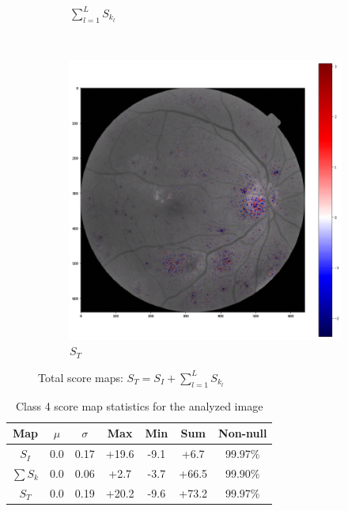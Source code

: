 \begin{figure}[!ht]
\begin{subfigure}{0.45\textwidth}
		\caption{$\sum_{l=1}^L S_{k_l}$}
		\label{score:fig:score_kmapped}
	\end{subfigure}
	~ %
	\begin{subfigure}{0.45\textwidth}
		\includegraphics[width=\textwidth]{Figures/chapter_interpretation/figures/maps/tot.png}
		\caption{$S_{T}$}
		\label{score:fig:score_total}
	\end{subfigure}
	\caption[Total score maps]{Total score maps: $S_{T} = S_I + \sum_{l=1}^L S_{k_l}$}
	\label{score:fig:total_score_maps}
\end{figure}


\begin{table}[ht]
	\centering
	\begin{tabular}{c c c c c c c}
		\hline
		\hline                        
		Map & $\mu$ & $\sigma$ & Max & Min & Sum & Non-null \\ 
		\hline
		$S_I$ & 0.0 & 0.17 & +19.6 & -9.1 & +6.7 & 99.97\%  \\
		$\sum S_k$ & 0.0 & 0.06 & +2.7 & -3.7 & +66.5 & 99.90\% \\
		$S_T$ & 0.0 & 0.19 & +20.2 & -9.6 & +73.2 & 99.97\% \\  
		\hline
	\end{tabular}
	\caption{Class 4 score map statistics for the analyzed image}
	\label{score:table:score_stats}
\end{table}

